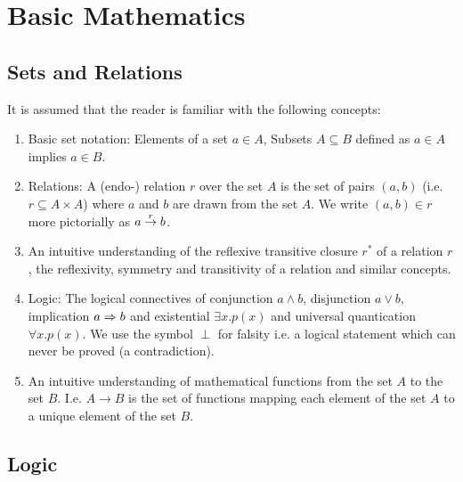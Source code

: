 \section{Basic Mathematics}


\begin{comment}
    - Logic:
        - Rule notation
        - Universal quantification

    - Inductive Sets
\end{comment}



\subsection{Sets and Relations}

It is assumed that the reader is familiar with the following concepts:

\begin{enumerate}

\item Basic set notation: Elements of a set $a \in A$, Subsets $A \subseteq B$
defined as $a \in A$ implies $a \in B$.

\item Relations: A (endo-) relation $r$ over the set $A$ is the set of pairs
$(a,b)$ (i.e. $r \subseteq A \times A$) where $a$ and $b$ are drawn from the set
$A$. We write $(a,b) \in r$ more pictorially as $a \stackrel{r}{\to} b$.

\item An intuitive understanding of the reflexive transitive closure $r^*$ of a
relation $r$, the reflexivity, symmetry and transitivity of a relation and
similar concepts.

\item Logic: The logical connectives of conjunction $a \land b$, disjunction $a
\lor b$, implication $a \Rightarrow b$ and existential $\exists x. p(x)$ and universal
quantication $\forall x.p(x)$. We use the symbol $\perp$ for falsity i.e. a
logical statement which can never be proved (a contradiction).

\item An intuitive understanding of mathematical functions from the set $A$ to
the set $B$. I.e. $A \to B$ is the set of functions mapping each element of the
set $A$ to a unique element of the set $B$.
\end{enumerate}





\subsection{Logic}

